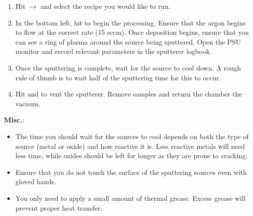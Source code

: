 \begin{enumerate}
\item Hit $\rightarrow$ and select the recipe you would like to run.
\item In the bottom left, hit  to begin the processing. Ensure that the argon begins to flow at the correct rate (15 sccm).
      Once deposition begins, ensure that you can see a ring of plasma around the source being sputtered. Open the PSU monitor and record
      relevant parameters in the sputterer logbook.
\item Once the sputtering is complete, wait for the source to cool down. A rough rule of thumb is to wait half of the sputtering time for this
      to occur.
\item Hit  and  to vent the sputterer. Remove samples and return the chamber the vacuum.
\end{enumerate}

\noindent \textbf{Misc.}:
\begin{itemize}
\item The time you should wait for the sources to cool depends on both the type of source (metal or oxide) and how reactive it is.
      Less reactive metals will need less time, while oxides should be left for longer as they are prone to cracking.
\item Ensure that you do not touch the surface of the sputtering sources even with gloved hands.
\item You only need to apply a small amount of thermal grease. Excess grease will prevent proper heat transfer.
\end{itemize}
\newpage

